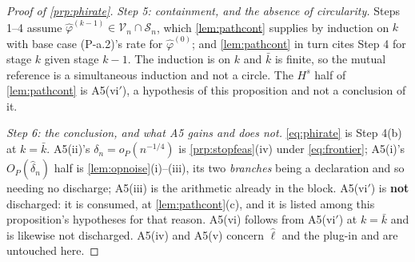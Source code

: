 \begin{proof}[Proof of \cref{prp:phirate}]
\emph{Step 5: containment, and the absence of circularity.} Steps 1--4 assume
$\hat\varphi^{(k-1)}\in\mathcal V_n\cap\mathcal S_n$, which \cref{lem:pathcont} supplies by induction
on $k$ with base case (P-a.2)'s rate for $\hat\varphi^{(0)}$; and \cref{lem:pathcont} in turn cites
Step 4 for stage $k$ given stage $k-1$. The induction is on $k$ and $\bar k$ is finite, so the
mutual reference is a simultaneous induction and not a circle. The $H^{s}$ half of
\cref{lem:pathcont} is A5(vi$'$), a hypothesis of this proposition and not a conclusion of it.

\emph{Step 6: the conclusion, and what A5 gains and does not.} \eqref{eq:phirate} is Step 4(b) at
$k=\bar k$. A5(ii)'s $\delta_n=o_P(n^{-1/4})$ is \cref{prp:stopfeas}(iv) under \eqref{eq:frontier};
A5(i)'s $O_P(\hat\delta_n)$ half is \cref{lem:opnoise}(i)--(iii), its two \emph{branches} being a
declaration and so needing no discharge; A5(iii) is the arithmetic already in the
block. A5(vi$'$) is \textbf{not} discharged: it is consumed, at \cref{lem:pathcont}(c), and it is
listed among this proposition's hypotheses for that reason. A5(vi) follows from A5(vi$'$) at
$k=\bar k$ and is likewise not discharged. A5(iv) and A5(v) concern $\hat\ell$ and the plug-in and are
untouched here.
\end{proof}

